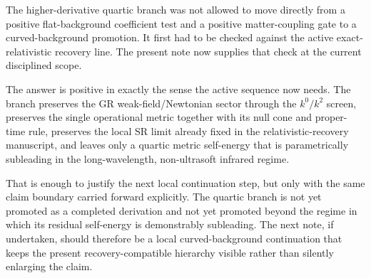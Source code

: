 \documentclass[11pt]{article}
\begin{document}
The higher-derivative quartic branch was not allowed to move directly from a positive flat-background coefficient test and a positive matter-coupling gate to a curved-background promotion. It first had to be checked against the active exact-relativistic recovery line. The present note now supplies that check at the current disciplined scope.

The answer is positive in exactly the sense the active sequence now needs. The branch preserves the GR weak-field/Newtonian sector through the \(k^0/k^2\) screen, preserves the single operational metric together with its null cone and proper-time rule, preserves the local SR limit already fixed in the relativistic-recovery manuscript, and leaves only a quartic metric self-energy that is parametrically subleading in the long-wavelength, non-ultrasoft infrared regime.

That is enough to justify the next local continuation step, but only with the same claim boundary carried forward explicitly. The quartic branch is not yet promoted as a completed derivation and not yet promoted beyond the regime in which its residual self-energy is demonstrably subleading. The next note, if undertaken, should therefore be a local curved-background continuation that keeps the present recovery-compatible hierarchy visible rather than silently enlarging the claim.
\end{document}
